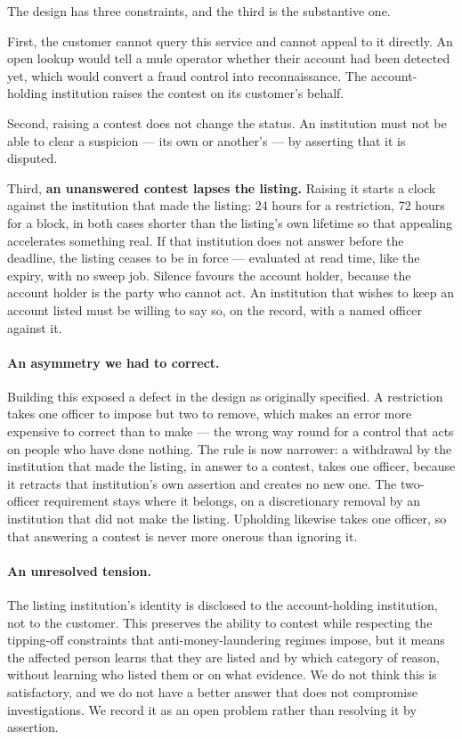 \documentclass[10pt,a4paper,twocolumn]{article}
\begin{document}
The design has three constraints, and the third is the substantive one.

First, the customer cannot query this service and cannot appeal to it directly.
An open lookup would tell a mule operator whether their account had been
detected yet, which would convert a fraud control into reconnaissance. The
account-holding institution raises the contest on its customer's behalf.

Second, raising a contest does not change the status. An institution must not be
able to clear a suspicion --- its own or another's --- by asserting that it is
disputed.

Third, \textbf{an unanswered contest lapses the listing.} Raising it starts a
clock against the institution that made the listing: 24 hours for a restriction,
72 hours for a block, in both cases shorter than the listing's own lifetime so
that appealing accelerates something real. If that institution does not answer
before the deadline, the listing ceases to be in force --- evaluated at read time,
like the expiry, with no sweep job. Silence favours the account holder, because
the account holder is the party who cannot act. An institution that wishes to
keep an account listed must be willing to say so, on the record, with a named
officer against it.

\paragraph{An asymmetry we had to correct.}
Building this exposed a defect in the design as originally specified. A
restriction takes one officer to impose but two to remove, which makes an error
more expensive to correct than to make --- the wrong way round for a control that
acts on people who have done nothing. The rule is now narrower: a withdrawal by
the institution that made the listing, in answer to a contest, takes one officer,
because it retracts that institution's own assertion and creates no new one. The
two-officer requirement stays where it belongs, on a discretionary removal by an
institution that did not make the listing. Upholding likewise takes one officer,
so that answering a contest is never more onerous than ignoring it.

\paragraph{An unresolved tension.}
The listing institution's identity is disclosed to the account-holding
institution, not to the customer. This preserves the ability to contest while
respecting the tipping-off constraints that anti-money-laundering regimes
impose, but it means the affected person learns that they are listed and by
which category of reason, without learning who listed them or on what evidence.
We do not think this is satisfactory, and we do not have a better answer that
does not compromise investigations. We record it as an open problem rather than
resolving it by assertion.
\end{document}
